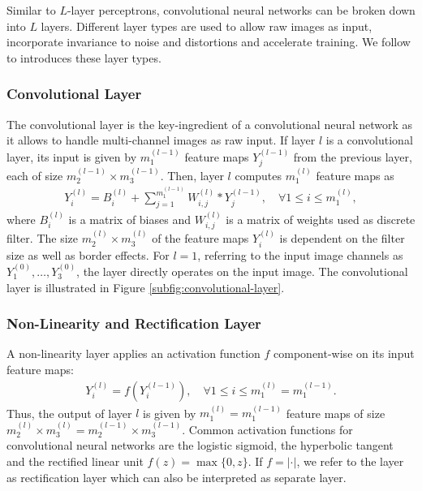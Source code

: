 Similar to $L$-layer perceptrons, convolutional neural networks can be broken down into $L$ layers. Different layer types are used to allow raw images as input, incorporate invariance to noise and distortions and accelerate training. We follow \cite{JarrettKavukcuogluRanzatoLeCun:2009} to introduces these layer types.

\subsubsection{Convolutional Layer}
\label{subsubsec:convolutional-layer}

The convolutional layer is the key-ingredient of a convolutional neural network as it allows to handle multi-channel images as raw input. If layer $l$ is a convolutional layer, its input is given by $m_1^{(l-1)}$ feature maps $Y_j^{(l-1)}$ from the previous layer, each of size $m_2^{(l-1)} \times m_3^{(l-1)}$. Then, layer $l$ computes $m_1^{(l)}$ feature maps as
\begin{align}
    Y_i^{(l)} = B_i^{(l)} + \sum_{j = 1}^{m_1^{(l-1)}} W_{i,j}^{(l)} \ast Y_j^{(l-1)},\quad\forall 1 \leq i \leq m_1^{(l)}\label{eq:convolutional-layer},
\end{align}
where $B_i^{(l)}$ is a matrix of biases and $W_{i,j}^{(l)}$ is a matrix of weights used as discrete filter. The size $m_2^{(l)} \times m_3^{(l)}$ of the feature maps $Y_i^{(l)}$ is dependent on the filter size as well as border effects. For $l = 1$, referring to the input image channels as $Y_1^{(0)}, \ldots, Y_3^{(0)}$, the layer directly operates on the input image. The convolutional layer is illustrated in Figure \ref{subfig:convolutional-layer}.

\subsubsection{Non-Linearity and Rectification Layer}

A non-linearity layer applies an activation function $f$ component-wise on its input feature maps:
\begin{align}
    Y_i^{(l)} = f\left(Y_i^{(l-1)}\right),\quad\forall 1 \leq i \leq m_1^{(l)} = m_1^{(l - 1)}.
\end{align}
Thus, the output of layer $l$ is given by $m_1^{(l)} = m_1^{(l-1)}$ feature maps of size $m_2^{(l)} \times m_3^{(l)} = m_2^{(l-1)} \times m_3^{(l-1)}$. Common activation functions for convolutional neural networks are the logistic sigmoid, the hyperbolic tangent and the rectified linear unit $f(z) = \max\{0,z\}$. If $f = |\cdot|$, we refer to the layer as rectification layer which can also be interpreted as separate layer. 

